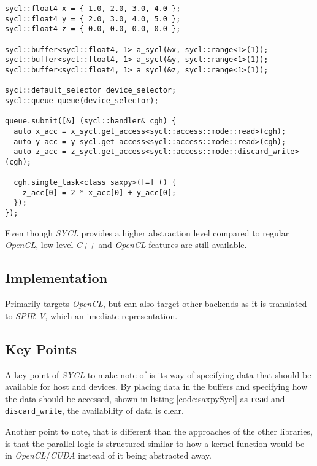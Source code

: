 \begin{lstlisting}[caption={\textit{SAXPY} implemented in \textit{SYCL}.}, label={code:saxpySycl}]
sycl::float4 x = { 1.0, 2.0, 3.0, 4.0 };
sycl::float4 y = { 2.0, 3.0, 4.0, 5.0 };
sycl::float4 z = { 0.0, 0.0, 0.0, 0.0 };

sycl::buffer<sycl::float4, 1> a_sycl(&x, sycl::range<1>(1));
sycl::buffer<sycl::float4, 1> a_sycl(&y, sycl::range<1>(1));
sycl::buffer<sycl::float4, 1> a_sycl(&z, sycl::range<1>(1));

sycl::default_selector device_selector;
sycl::queue queue(device_selector);

queue.submit([&] (sycl::handler& cgh) {
  auto x_acc = x_sycl.get_access<sycl::access::mode::read>(cgh);
  auto y_acc = y_sycl.get_access<sycl::access::mode::read>(cgh);
  auto z_acc = z_sycl.get_access<sycl::access::mode::discard_write>(cgh);

  cgh.single_task<class saxpy>([=] () {
    z_acc[0] = 2 * x_acc[0] + y_acc[0];
  });
});
\end{lstlisting}

Even though \textit{SYCL} provides a higher abstraction level compared to regular \textit{OpenCL}, low-level \textit{C++} and \textit{OpenCL} features are still available.

\subsection{Implementation}
Primarily targets \textit{OpenCL}, but can also target other backends as it is translated to \textit{SPIR-V}, which an imediate representation.

\subsection{Key Points}
A key point of \textit{SYCL} to make note of is its way of specifying data that should be available for host and devices. By placing data in the buffers and specifying how the data should be accessed, shown in listing \ref{code:saxpySycl} as \texttt{read} and \texttt{discard\_write}, the availability of data is clear. 

Another point to note, that is different than the approaches of the other libraries, is that the parallel logic is structured similar to how a kernel function would be in \textit{OpenCL}/\textit{CUDA} instead of it being abstracted away.
